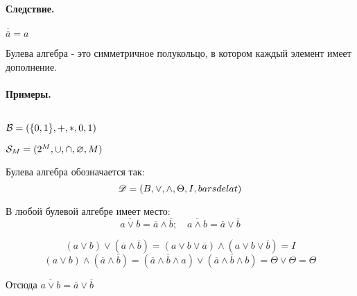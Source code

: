 \paragraph*{Следствие.}
$\overline{\overline{a}} = a$

\begin{definition}
Булева алгебра - это симметричное полукольцо, в котором каждый элемент имеет дополнение.
\end{definition}

\paragraph*{Примеры.} ${}$ \newline

${\cal B} = (\{0,1\}, +, *, 0, 1 )$ 

${\cal S}_M = (2^{M}, \cup, \cap, \varnothing, M)$

\medskip

Булева алгебра обозначается так:
\[
    \mathscr{D} = (B, \lor, \land, \Theta, I, bar sdelat)
\] 

\begin{theorem}
В любой булевой алгебре имеет место:
\[
\overline{a \lor b} = \overline{a} \land \overline{b}; \quad
\overline{a \land b} = \overline{a} \lor \overline{b}
\]
\end{theorem}
\begin{myproof}
    \[
        (a \lor b) \lor (\overline{a} \land \overline{b}) = (a \lor b \lor \overline{a}) \land
        (a \lor b \lor \overline{b}) = I
    \]
    \[
        (a \lor b) \land (\overline{a} \land \overline{b}) = (\overline{a} \land \overline{b}
        \land a) \lor (\overline{a} \land \overline{b} \land b) = \Theta \lor \Theta = \Theta
    \] 

    Отсюда $\overline{a \lor b} = \overline{a} \lor \overline{b}$
\end{myproof}



